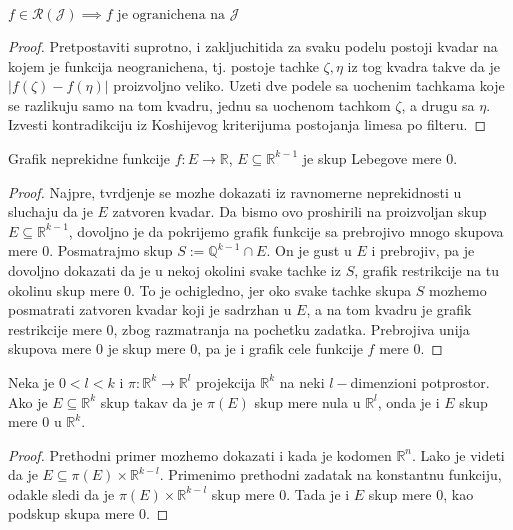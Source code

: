 \documentclass[a4paper,12pt]{article}
\newcommand{\QQ}{\mathbb{Q}}
\newcommand{\RR}{\mathbb{R}}
\newcommand{\psj}{\subseteq}
\begin{document}
\begin{lema}
	\( f \in \mathcal R (\mathcal J) \implies f \text{ je ogranichena na } \mathcal J \) 
\end{lema}
\begin{proof}
	Pretpostaviti suprotno, i zakljuchitida za svaku podelu postoji kvadar na kojem je funkcija
	neogranichena, tj. postoje tachke $\zeta, \eta$ iz tog kvadra takve da je \( |f(\zeta) - f(\eta)| \) 
	proizvoljno veliko. Uzeti dve podele sa uochenim tachkama koje se razlikuju samo na tom kvadru,
	jednu sa uochenom tachkom $\zeta$, a drugu sa $\eta$. Izvesti kontradikciju iz Koshijevog kriterijuma
	postojanja limesa po filteru.
\end{proof}

\begin{pr}
	Grafik neprekidne funkcije $f: E \to \RR$, $E \psj \RR^{k-1}$ je skup Lebegove mere $0$.
\end{pr}
\begin{proof}
	Najpre, tvrdjenje se mozhe dokazati iz ravnomerne neprekidnosti u sluchaju da je $E$ zatvoren kvadar.
	Da bismo ovo proshirili na proizvoljan skup $E\psj \RR^{k-1}$, dovoljno je da pokrijemo grafik funkcije
	sa prebrojivo mnogo skupova mere $0$. Posmatrajmo skup $S:= \QQ^{k-1}\cap E$. On je gust u $E$ i prebrojiv,
	pa je dovoljno dokazati da je u nekoj okolini svake tachke iz $S$, grafik restrikcije
	na tu okolinu skup mere $0$. To je ochigledno, jer oko svake tachke skupa $S$ mozhemo posmatrati zatvoren
	kvadar koji je sadrzhan u $E$, a na tom kvadru je grafik restrikcije mere $0$, zbog razmatranja na pochetku 
	zadatka. Prebrojiva unija skupova mere $0$ je skup mere $0$, pa je i grafik cele funkcije $f$ mere $0$.
\end{proof}

\begin{pr}
	Neka je $0 < l < k$ i $\pi: \RR^k\to \RR^l$ projekcija $\RR^k$ na neki $l-$dimenzioni potprostor.
	Ako je $E\psj \RR^k$ skup takav da je $\pi(E)$ skup mere nula u $\RR^l$, onda je i $E$ skup mere $0$
	u $\RR^k$.
\end{pr}
\begin{proof}
	Prethodni primer mozhemo dokazati i kada je kodomen $\RR^n$. Lako je videti da je \( E\psj \pi(E)\times \RR^{k-l} \).
	Primenimo prethodni zadatak na konstantnu funkciju, odakle sledi da je $\pi(E)\times \RR^{k-l}$ skup mere $0$.
	Tada je i $E$ skup mere $0$, kao podskup skupa mere $0$.
\end{proof}
\end{document}
